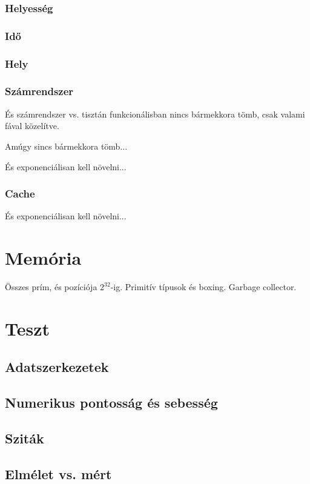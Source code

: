 \subsubsection{Helyesség}

\subsubsection{Idő}

\subsubsection{Hely}

\subsubsection{Számrendszer}

És számrendszer vs. tisztán funkcionálisban nincs bármekkora tömb, csak valami fával közelítve.

Amúgy sincs bármekkora tömb...

És exponenciálisan kell növelni...

\subsubsection{Cache}

És exponenciálisan kell növelni...

\section{Memória}

Összes prím, és pozíciója $2^32$-ig. Primitív típusok és boxing. Garbage collector.

\section{Teszt}

\subsection{Adatszerkezetek}

\subsection{Numerikus pontosság és sebesség}

\subsection{Sziták}

\subsection{Elmélet vs. mért}
